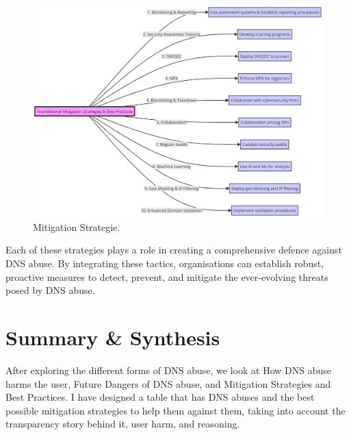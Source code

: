 \captionsetup{font= footnotesize}
\begin{figure} [H]
    \centering
   \includegraphics[width=1.0\textwidth]{background/diagram (7).png}
    \caption{Mitigation Strategie.}
    \label{sadasdasdada}
\end{figure}

Each of these strategies plays a role in creating a comprehensive defence against DNS abuse. By integrating these tactics, organisations can establish robust, proactive measures to detect, prevent, and mitigate the ever-evolving threats posed by DNS abuse.

\section{Summary \& Synthesis}

After exploring the different forms of DNS abuse, we look at How DNS abuse harms the user, Future Dangers of DNS abuse, and Mitigation Strategies and Best Practices. I have designed a table that has DNS abuses and the best possible mitigation strategies to help them against them, taking into account the transparency story behind it, user harm, and reasoning. 


